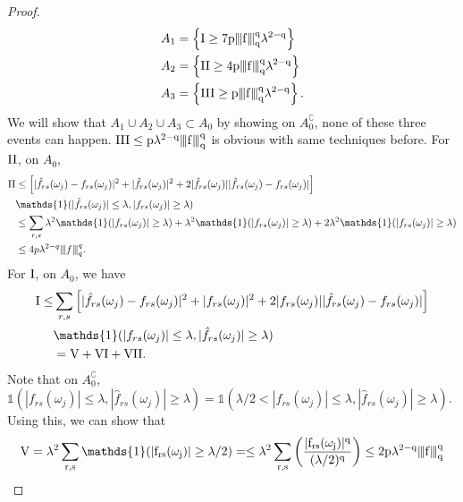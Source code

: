 \begin{proof}
\begin{equation*}
\begin{aligned}
&A_1 = \left\{\rm{I} \ge 7p{\left\vert\kern-0.25ex\left\vert\kern-0.25ex\left\vert f \right\vert\kern-0.25ex\right\vert\kern-0.25ex\right\vert}_q^q \lambda^{2-q}\right\}\\
&A_2 = \left\{\rm{II}\ge 4p{\left\vert\kern-0.25ex\left\vert\kern-0.25ex\left\vert f \right\vert\kern-0.25ex\right\vert\kern-0.25ex\right\vert}_q^q \lambda^{2-q}\right\}\\
&A_3 = \left\{\rm{III}\ge p{\left\vert\kern-0.25ex\left\vert\kern-0.25ex\left\vert f \right\vert\kern-0.25ex\right\vert\kern-0.25ex\right\vert}_q^q \lambda^{2-q}\right\}.
\end{aligned}
\end{equation*}
We will show that $A_1\cup A_2 \cup A_3 \subset A_0$ by showing on $A_0^\complement$, none of these three events can happen.  $\rm{III}\le p\lambda^{2-q}{\left\vert\kern-0.25ex\left\vert\kern-0.25ex\left\vert f \right\vert\kern-0.25ex\right\vert\kern-0.25ex\right\vert}_q^q$ is obvious with same techniques before. For $\rm{II}$, on $A_0$, 
\begin{equation*}
\begin{aligned}
\rm{II} &\le \left[|\hat{f}_{rs}(\omega_j)-f_{rs}(\omega_j)|^2 + |\hat{f}_{rs}(\omega_j)|^2 +2 |\hat{f}_{rs}(\omega_j)||\hat{f}_{rs}(\omega_j)-f_{rs}(\omega_j)|\right]\\
&  \mathds{1}(|\hat{f}_{rs}(\omega_j)|\le \lambda, |f_{rs}(\omega_j)|\ge \lambda)\\
& \le \sum_{r,s} \lambda^2\mathds{1}(|f_{rs}(\omega_j)|\ge \lambda) + \lambda^2\mathds{1}(|f_{rs}(\omega_j)|\ge \lambda)+2\lambda^2\mathds{1}(|f_{rs}(\omega_j)|\ge \lambda) \\
& \le 4p\lambda^{2-q}\vertiii{f}_q^q. 
\end{aligned}
\end{equation*}
For $\rm{I}$, on $A_0$, we have
\begin{equation*}
\begin{aligned}
\rm{I}\le& \sum_{r,s}\left[|\hat{f}_{rs}(\omega_j)-f_{rs}(\omega_j)|^2 + |f_{rs}(\omega_j)|^2+ 2|f_{rs}(\omega_j)||\hat{f}_{rs}(\omega_j)-f_{rs}(\omega_j)|\right] \\ 
& \mathds{1}(|f_{rs}(\omega_j)|\le \lambda, |\hat{f}_{rs}(\omega_j)|\ge \lambda)\\
& = \rm{V}+\rm{VI}+\rm{VII}. 
\end{aligned}
\end{equation*}
Note that on $A_0^\complement$, $\mathds{1}(|f_{rs}(\omega_j)|\le \lambda, |\hat{f}_{rs}(\omega_j)|\ge \lambda)=\mathds{1}(\lambda/2<|f_{rs}(\omega_j)|\le \lambda, |\hat{f}_{rs}(\omega_j)|\ge \lambda)$. Using this, we can show that 
\begin{equation*}
\begin{aligned}
& \rm{V} = \lambda^2 \sum_{r,s}\mathds{1}(|f_{rs}(\omega_j)|\ge \lambda/2)=\le \lambda^2 \sum_{r,s}\left(\frac{|f_{rs}(\omega_j)|^q}{(\lambda/2)^q}\right) \le 2p\lambda^{2-q}\vertiii{f}_q^q\\

\end{aligned}
\end{equation*}
\end{proof}
